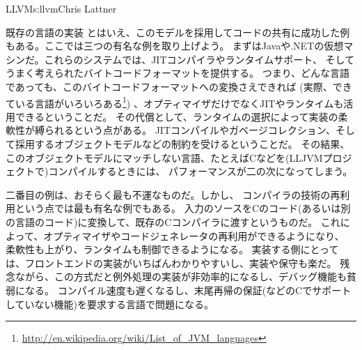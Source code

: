 \begin{aosachapter}{LLVM}{s:llvm}{Chris Lattner}
\begin{aosasect1}{既存の言語の実装}
とはいえ、このモデルを採用してコードの共有に成功した例もある。ここでは三つの有名な例を取り上げよう。
まずはJavaや.NETの仮想マシンだ。これらのシステムでは、JITコンパイラやランタイムサポート、
そしてうまく考えられたバイトコードフォーマットを提供する。
つまり、どんな言語であっても、このバイトコードフォーマットへの変換さえできれば
(実際、できている言語がいろいろある\footnote{\url{http://en.wikipedia.org/wiki/List_of_JVM_languages}})
、オプティマイザだけでなくJITやランタイムも活用できるということだ。
その代償として、ランタイムの選択によって実装の柔軟性が縛られるという点がある。
JITコンパイルやガベージコレクション、そして採用するオブジェクトモデルなどの制約を受けるということだ。
その結果、このオブジェクトモデルにマッチしない言語、たとえばCなどを(LLJVMプロジェクトで)コンパイルするときには、
パフォーマンスが二の次になってしまう。

二番目の例は、おそらく最も不運なものだ。しかし、
コンパイラの技術の再利用という点では最も有名な例でもある。
入力のソースをCのコード(あるいは別の言語のコード)に変換して、既存のCコンパイラに渡すというものだ。
これによって、オプティマイザやコードジェネレータの再利用ができるようになり、
柔軟性も上がり、ランタイムも制御できるようになる。
実装する側にとっては、フロントエンドの実装がいちばんわかりやすいし、実装や保守も楽だ。
残念ながら、この方式だと例外処理の実装が非効率的になるし、デバッグ機能も貧弱になる。
コンパイル速度も遅くなるし、末尾再帰の保証(などのCでサポートしていない機能)を要求する言語で問題になる。


\end{aosasect1}
\end{aosachapter}

